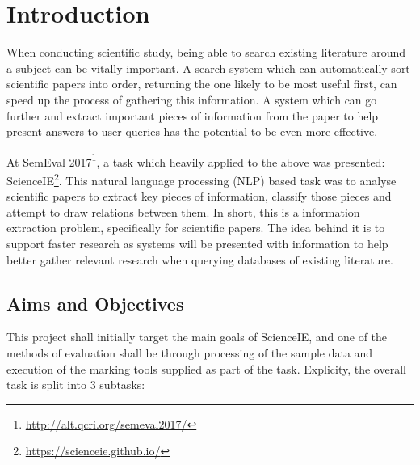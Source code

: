 \chapter{Introduction}

When conducting scientific study, being able to search existing literature around a subject can be vitally important. A search system which can automatically sort scientific papers into order, returning the one likely to be most useful first, can speed up the process of gathering this information. A system which can go further and extract important pieces of information from the paper to help present answers to user queries has the potential to be even more effective.

At SemEval 2017\footnote{\href{http://alt.qcri.org/semeval2017/}{http://alt.qcri.org/semeval2017/}}, a task which heavily applied to the above was presented: ScienceIE\footnote{\href{https://scienceie.github.io/}{https://scienceie.github.io/}}. This natural language processing (NLP) based task was to analyse scientific papers to extract key pieces of information, classify those pieces and attempt to draw relations between them. In short, this is a information extraction problem, specifically for scientific papers. The idea behind it is to support faster research as systems will be presented with information to help better gather relevant research when querying databases of existing literature.

\section{Aims and Objectives}

This project shall initially target the main goals of ScienceIE, and one of the methods of evaluation shall be through processing of the sample data and execution of the marking tools supplied as part of the task. Explicity, the overall task is split into 3 subtasks:

